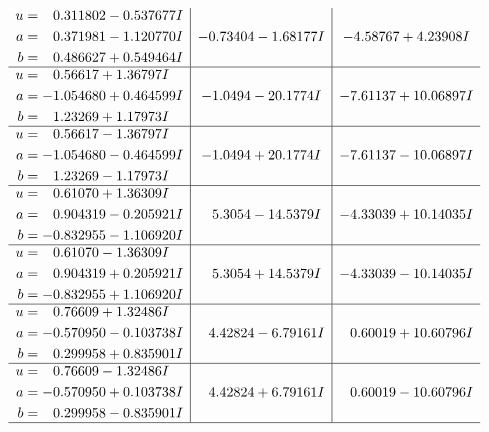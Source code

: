 \documentclass[1p]{elsarticle_modified}
\theoremstyle{definition}
\begin{document}
$$\begin{array}{c|c|c}
\begin{aligned}
u &= \phantom{-}0.311802 - 0.537677 I \\
a &= \phantom{-}0.371981 - 1.120770 I \\
b &= \phantom{-}0.486627 + 0.549464 I\end{aligned}
 & -0.73404 - 1.68177 I & -4.58767 + 4.23908 I \\ \hline\begin{aligned}
u &= \phantom{-}0.56617 + 1.36797 I \\
a &= -1.054680 + 0.464599 I \\
b &= \phantom{-}1.23269 + 1.17973 I\end{aligned}
 & -1.0494 - 20.1774 I & -7.61137 + 10.06897 I \\ \hline\begin{aligned}
u &= \phantom{-}0.56617 - 1.36797 I \\
a &= -1.054680 - 0.464599 I \\
b &= \phantom{-}1.23269 - 1.17973 I\end{aligned}
 & -1.0494 + 20.1774 I & -7.61137 - 10.06897 I \\ \hline\begin{aligned}
u &= \phantom{-}0.61070 + 1.36309 I \\
a &= \phantom{-}0.904319 - 0.205921 I \\
b &= -0.832955 - 1.106920 I\end{aligned}
 & \phantom{-}5.3054 - 14.5379 I & -4.33039 + 10.14035 I \\ \hline\begin{aligned}
u &= \phantom{-}0.61070 - 1.36309 I \\
a &= \phantom{-}0.904319 + 0.205921 I \\
b &= -0.832955 + 1.106920 I\end{aligned}
 & \phantom{-}5.3054 + 14.5379 I & -4.33039 - 10.14035 I \\ \hline\begin{aligned}
u &= \phantom{-}0.76609 + 1.32486 I \\
a &= -0.570950 - 0.103738 I \\
b &= \phantom{-}0.299958 + 0.835901 I\end{aligned}
 & \phantom{-}4.42824 - 6.79161 I & \phantom{-}0.60019 + 10.60796 I \\ \hline\begin{aligned}
u &= \phantom{-}0.76609 - 1.32486 I \\
a &= -0.570950 + 0.103738 I \\
b &= \phantom{-}0.299958 - 0.835901 I\end{aligned}
 & \phantom{-}4.42824 + 6.79161 I & \phantom{-}0.60019 - 10.60796 I\\
 \hline 
 \end{array}$$\newpage\newpage\renewcommand{\arraystretch}{1}
\end{document}
